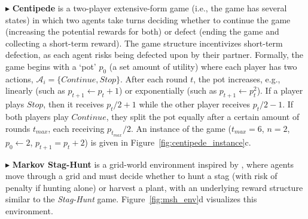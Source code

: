 \documentclass{ecai}
\theoremstyle{plain}
\theoremstyle{definition}
\theoremstyle{remark}
\begin{document}
$\blacktriangleright$ \textbf{Centipede} is a two-player extensive-form game (i.e., the game has several states) in which two agents take turns deciding whether to continue the game (increasing the potential rewards for both) or defect (ending the game and collecting a short-term reward). The game structure incentivizes short-term defection, as each agent risks being defected upon by their partner. Formally, the game begins with a `pot' $p_0$ (a set amount of utility) where each player has two actions, $\mathcal{A}_i=\{Continue,Stop\}$. After each round $t$, the pot increases, e.g., linearly (such as $p_{t+1}\leftarrow p_t+1$) or exponentially (such as $p_{t+1}\leftarrow p_t^2$). If a player plays $Stop$, then it receives $p_t/2+1$ while the other player receives $p_t/2-1$. If both players play $Continue$, they split the pot equally after a certain amount of rounds $t_{max}$, each receiving $p_{t_{max}}/2$. An instance of the game ($t_{max}=6$, $n=2$, $p_0\leftarrow2$, $p_{t+1}=p_t+2$) is given in Figure~\ref{fig:centipede_instance}c.

$\blacktriangleright$ \textbf{Markov Stag-Hunt} is a grid-world environment inspired by \citet{peysakhovich2018prosocial}, where agents move through a grid and must decide whether to hunt a stag (with risk of penalty if hunting alone) or harvest a plant, with an underlying reward structure similar to the \textit{Stag-Hunt} game. Figure~\ref{fig:msh_env}d visualizes this environment.






\end{document}
